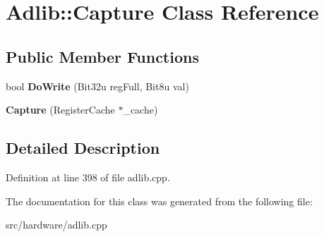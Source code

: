 \hypertarget{classAdlib_1_1Capture}{\section{Adlib\-:\-:Capture Class Reference}
\label{classAdlib_1_1Capture}
}
\subsection*{Public Member Functions}
\begin{DoxyCompactItemize}
\item 
\hypertarget{classAdlib_1_1Capture_a2bc4e88dfc7ead50b3cd50fded3cfbaa}{bool {\bfseries Do\-Write} (Bit32u reg\-Full, Bit8u val)}\label{classAdlib_1_1Capture_a2bc4e88dfc7ead50b3cd50fded3cfbaa}

\item 
\hypertarget{classAdlib_1_1Capture_a42d440dbc3803819534a51e9434c8f4e}{{\bfseries Capture} (Register\-Cache $\ast$\-\_\-cache)}\label{classAdlib_1_1Capture_a42d440dbc3803819534a51e9434c8f4e}

\end{DoxyCompactItemize}


\subsection{Detailed Description}


Definition at line 398 of file adlib.\-cpp.



The documentation for this class was generated from the following file\-:\begin{DoxyCompactItemize}
\item 
src/hardware/adlib.\-cpp\end{DoxyCompactItemize}
